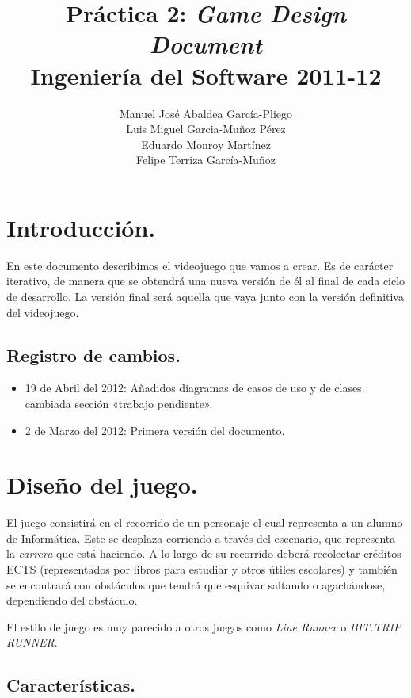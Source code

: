 \documentclass[12 pt, a4paper, twoside]{article}
\title{Práctica 2: {\em Game Design Document}\\Ingeniería del Software 2011-12}
\author{Manuel José Abaldea García-Pliego\\
Luis Miguel Garcia-Muñoz Pérez\\
Eduardo Monroy Martínez\\
Felipe Terriza García-Muñoz}
\date{}
\begin{document}
\maketitle

%


\section{Introducción.}

En este documento describimos el videojuego que vamos a crear. Es de carácter
iterativo, de manera que se obtendrá una nueva versión de él al final de cada
ciclo de desarrollo. La versión final será aquella que vaya junto con la
versión definitiva del videojuego.

\subsection{Registro de cambios.}

\begin{itemize}
  \item 19 de Abril del 2012: Añadidos diagramas de casos de uso y de clases.
    cambiada sección «trabajo pendiente».
  \item 2 de Marzo del 2012: Primera versión del documento.
\end{itemize}

\section{Diseño del juego.}

El juego consistirá en el recorrido de un personaje el cual representa a un
alumno de Informática. Este se desplaza corriendo a través del escenario, que
representa la {\em carrera} que está haciendo. A lo largo de su recorrido
deberá recolectar créditos ECTS (representados por libros para estudiar y otros
útiles escolares) y también se encontrará con obstáculos que tendrá que
esquivar saltando o agachándose, dependiendo del obstáculo.

El estilo de juego es muy parecido a otros juegos como {\em Line Runner} o {\em
BIT.TRIP RUNNER}.

\subsection{Características.}
\end{document}

